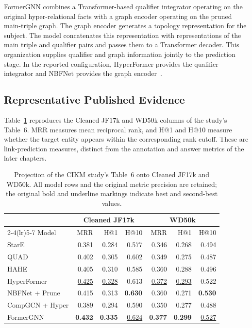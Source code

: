 FormerGNN combines a Transformer-based qualifier integrator operating on the original hyper-relational facts with a graph encoder operating on the pruned main-triple graph. The graph encoder generates a topology representation for the subject. The model concatenates this representation with representations of the main triple and qualifier pairs and passes them to a Transformer decoder. This organization supplies qualifier and graph information jointly to the prediction stage. In the reported configuration, HyperFormer provides the qualifier integrator and NBFNet provides the graph encoder~\cite{bg-hyperformer,bg-nbfnet}.

\subsection{Representative Published Evidence}

Table~\ref{tab:background:formergnn} reproduces the Cleaned JF17k and WD50k columns of the study's Table~6. MRR measures mean reciprocal rank, and H@1 and H@10 measure whether the target entity appears within the corresponding rank cutoff. These are link-prediction measures, distinct from the annotation and answer metrics of the later chapters.

\begin{table}[tbp]
\centering
\caption{Projection of the CIKM study's Table~6 onto Cleaned JF17k and WD50k. All model rows and the original metric precision are retained; the original bold and underline markings indicate best and second-best values.}
\label{tab:background:formergnn}
\small
\begin{tabular}{lrrrrrr}
\toprule
&\multicolumn{3}{c}{Cleaned JF17k}&\multicolumn{3}{c}{WD50k}\\
\cmidrule(lr){2-4}\cmidrule(lr){5-7}
Model&MRR&H@1&H@10&MRR&H@1&H@10\\
\midrule
StarE&0.381&0.284&0.577&0.346&0.268&0.494\\
QUAD&0.402&0.305&0.602&0.349&0.275&0.487\\
HAHE&0.405&0.310&0.585&0.360&0.288&0.496\\
HyperFormer&\underline{0.425}&\underline{0.328}&0.613&\underline{0.372}&\underline{0.293}&0.522\\
NBFNet + Prune&0.415&0.313&\textbf{0.630}&0.360&0.271&\textbf{0.530}\\
CompGCN + Hyper&0.389&0.294&0.590&0.350&0.277&0.488\\
FormerGNN&\textbf{0.432}&\textbf{0.335}&\underline{0.624}&\textbf{0.377}&\textbf{0.299}&\underline{0.527}\\
\bottomrule
\end{tabular}
\end{table}

